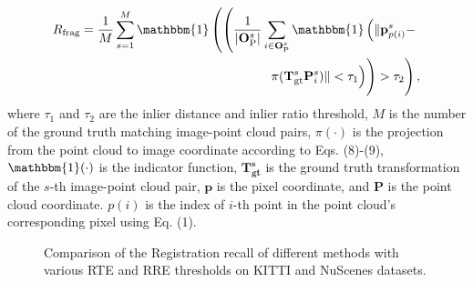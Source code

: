 \documentclass[lettersize,journal]{IEEEtran}
\begin{document}
\begin{equation}
\begin{aligned}
     R_\text{frag}=\frac{1}{M}\sum_{s=1}^{M}\mathbbm{1}\left(\left(\frac{1}{|\mathbf{O}_\text{P}^s|}\sum_{i\in \mathbf{O}_\text{P}^s}\mathbbm{1}\left(\|\mathbf{p}_{p(i)}^s-  \right. \right. \right.
     \\   \left.  \pi(\mathbf{T}_\text{gt}^s\mathbf{P}_i^s)\|<\tau_1 \Big)\Bigg)>\tau_2\right),
\end{aligned}
\end{equation}
where $\tau_1$ and $\tau_2$ are the inlier distance and inlier ratio threshold, $M$ is the number of the ground truth matching image-point cloud pairs, $\pi(\cdot)$ is the projection from the point cloud to image coordinate according to Eqs. (8)-(9), $\mathbbm{1}(\cdot)$ is the indicator function, $\mathbf{T_\text{gt}^s}$ is the ground truth transformation of the $s$-th image-point cloud pair, $\mathbf{p}$ is the pixel coordinate, and $\mathbf{P}$ is the point cloud coordinate. $p(i)$ is the index of $i$-th point in the point cloud's corresponding pixel using Eq. (1).



\begin{figure*}[h]
\centering
{}
\caption{Comparison of the Registration recall of different methods with various RTE and RRE thresholds on KITTI  and NuScenes datasets.}
\label{FIG6}
\end{figure*}
\end{document}
